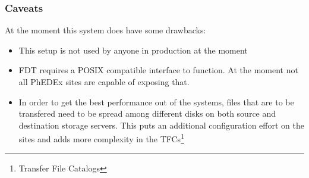 \subsubsection{Caveats}

At the moment this system does have some drawbacks:

\begin{itemize}
	\item This setup is not used by anyone in production at the moment
	\item FDT requires a POSIX compatible interface to function. At the moment
not all PhEDEx sites are capable of exposing that.
	\item In order to get the best performance out of the systems, files that
are to be transfered need to be spread among different disks on both source
and destination storage servers. This puts an additional configuration effort
on the sites and adds more complexity in the TFCs\footnote{Transfer File
Catalogs}
\end{itemize}